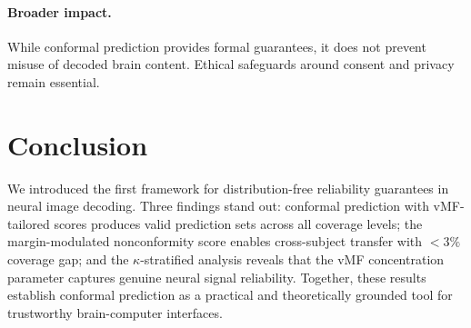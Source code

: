 \documentclass{article}
\begin{document}
\paragraph{Broader impact.} While conformal prediction provides formal guarantees, it does not prevent misuse of decoded brain content. Ethical safeguards around consent and privacy remain essential.

\section{Conclusion}

We introduced the first framework for distribution-free reliability guarantees in neural image decoding. Three findings stand out: conformal prediction with vMF-tailored scores produces valid prediction sets across all coverage levels; the margin-modulated nonconformity score enables cross-subject transfer with $<3\%$ coverage gap; and the $\kappa$-stratified analysis reveals that the vMF concentration parameter captures genuine neural signal reliability. Together, these results establish conformal prediction as a practical and theoretically grounded tool for trustworthy brain-computer interfaces.



\end{document}
